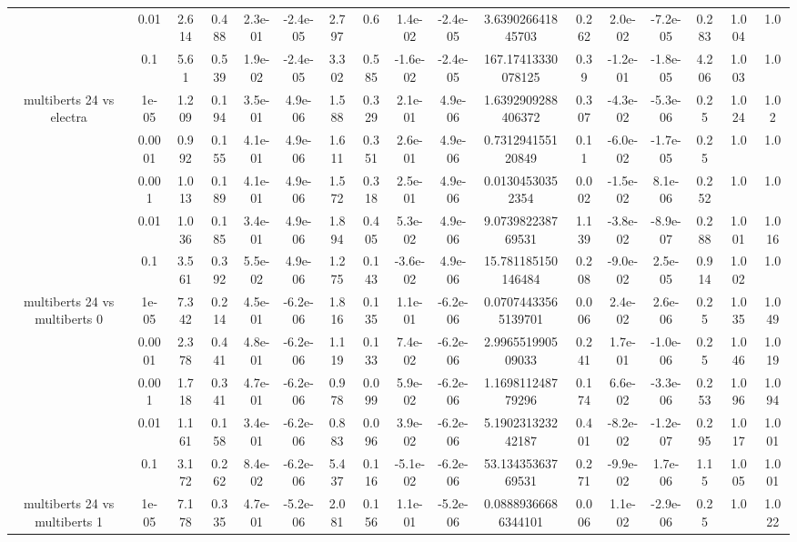\begin{tabular}{|c|c|c|c|c|c|c|c|c|c|c|c|c|c|c|c|c|}
 & 0.01 & 2.614 & 0.488 & 2.3e-01 & -2.4e-05 & 2.797 & 0.6 & 1.4e-02 & -2.4e-05 & 3.639026641845703 & 0.262 & 2.0e-02 & -7.2e-05 & 0.283 & 1.004 & 1.0 \\
 & 0.1 & 5.61 & 0.539 & 1.9e-02 & -2.4e-05 & 3.302 & 0.585 & -1.6e-02 & -2.4e-05 & 167.17413330078125 & 0.39 & -1.2e-01 & -1.8e-05 & 4.206 & 1.003 & 1.0 \\
\hline
\multirow{5}{*}{multiberts 24 vs electra } & 1e-05 & 1.209 & 0.194 & 3.5e-01 & 4.9e-06 & 1.588 & 0.329 & 2.1e-01 & 4.9e-06 & 1.6392909288406372 & 0.307 & -4.3e-02 & -5.3e-06 & 0.25 & 1.024 & 1.02 \\
 & 0.0001 & 0.992 & 0.155 & 4.1e-01 & 4.9e-06 & 1.611 & 0.351 & 2.6e-01 & 4.9e-06 & 0.731294155120849 & 0.11 & -6.0e-02 & -1.7e-05 & 0.25 & 1.0 & 1.0 \\
 & 0.001 & 1.013 & 0.189 & 4.1e-01 & 4.9e-06 & 1.572 & 0.318 & 2.5e-01 & 4.9e-06 & 0.01304530352354 & 0.002 & -1.5e-02 & 8.1e-06 & 0.252 & 1.0 & 1.0 \\
 & 0.01 & 1.036 & 0.185 & 3.4e-01 & 4.9e-06 & 1.894 & 0.405 & 5.3e-02 & 4.9e-06 & 9.073982238769531 & 1.139 & -3.8e-02 & -8.9e-07 & 0.288 & 1.001 & 1.016 \\
 & 0.1 & 3.561 & 0.392 & 5.5e-02 & 4.9e-06 & 1.275 & 0.143 & -3.6e-02 & 4.9e-06 & 15.781185150146484 & 0.208 & -9.0e-02 & 2.5e-05 & 0.914 & 1.002 & 1.0 \\
\hline
\multirow{5}{*}{multiberts 24 vs multiberts 0} & 1e-05 & 7.342 & 0.214 & 4.5e-01 & -6.2e-06 & 1.816 & 0.135 & 1.1e-01 & -6.2e-06 & 0.07074433565139701 & 0.006 & 2.4e-02 & 2.6e-06 & 0.25 & 1.035 & 1.049 \\
 & 0.0001 & 2.378 & 0.441 & 4.8e-01 & -6.2e-06 & 1.119 & 0.133 & 7.4e-02 & -6.2e-06 & 2.996551990509033 & 0.241 & 1.7e-01 & -1.0e-06 & 0.25 & 1.046 & 1.019 \\
 & 0.001 & 1.718 & 0.341 & 4.7e-01 & -6.2e-06 & 0.978 & 0.099 & 5.9e-02 & -6.2e-06 & 1.169811248779296 & 0.174 & 6.6e-02 & -3.3e-06 & 0.253 & 1.096 & 1.094 \\
 & 0.01 & 1.161 & 0.158 & 3.4e-01 & -6.2e-06 & 0.883 & 0.096 & 3.9e-02 & -6.2e-06 & 5.190231323242187 & 0.401 & -8.2e-02 & -1.2e-07 & 0.295 & 1.017 & 1.001 \\
 & 0.1 & 3.172 & 0.262 & 8.4e-02 & -6.2e-06 & 5.437 & 0.116 & -5.1e-02 & -6.2e-06 & 53.13435363769531 & 0.271 & -9.9e-02 & 1.7e-06 & 1.15 & 1.005 & 1.001 \\
\hline
\multirow{5}{*}{multiberts 24 vs multiberts 1} & 1e-05 & 7.178 & 0.335 & 4.7e-01 & -5.2e-06 & 2.081 & 0.156 & 1.1e-01 & -5.2e-06 & 0.08889366686344101 & 0.006 & 1.1e-02 & -2.9e-06 & 0.25 & 1.0 & 1.022 \\

\end{tabular}
